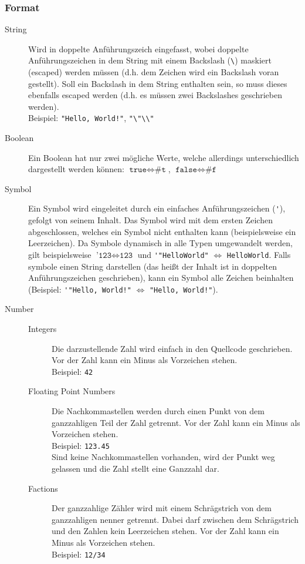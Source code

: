 \subsubsection{Format}
\begin{description}
	\item[String] Wird in doppelte Anführungszeich eingefasst, wobei doppelte Anführungszeichen in dem String mit einem Backslash (\texttt{\textbackslash}) maskiert (escaped) werden müssen (d.h. dem Zeichen wird ein Backslash voran gestellt). Soll ein Backslash in dem String enthalten sein, so muss dieses ebenfalls escaped werden (d.h. es müssen zwei Backslashes geschrieben werden). \\ Beispiel: \verb$"Hello, World!"$, \verb$"\"\\"$
	\item[Boolean] Ein Boolean hat nur zwei mögliche Werte, welche allerdings unterschiedlich dargestellt werden können: $ \texttt{true} \iff \texttt{\#t} $, $ \texttt{false} \iff \texttt{\#f} $
	\item[Symbol] Ein Symbol wird eingeleitet durch ein einfaches Anführungszeichen (\verb$'$), gefolgt von seinem Inhalt. Das Symbol wird mit dem ersten Zeichen abgeschlossen, welches ein Symbol nicht enthalten kann (beispielsweise ein Leerzeichen). Da Symbole dynamisch in alle Typen umgewandelt werden, gilt beispielsweise $ \texttt{'123} \iff \texttt{123} $
		und \verb$'"HelloWorld"$ $ \iff $ \verb$HelloWorld$. Falls symbole einen String darstellen (das heißt der Inhalt ist in doppelten Anführungszeichen geschrieben), kann ein Symbol alle Zeichen beinhalten (Beispiel: \verb$'"Hello, World!"$ $ \iff $ \verb$"Hello, World!"$).
	\item[Number]
		\begin{description}
			\item[Integers] Die darzustellende Zahl wird einfach in den Quellcode geschrieben. Vor der Zahl kann ein Minus als Vorzeichen stehen. \\ Beispiel: \texttt{42}
			\item[Floating Point Numbers] Die Nachkommastellen werden durch einen Punkt von dem ganzzahligen Teil der Zahl getrennt. Vor der Zahl kann ein Minus als Vorzeichen stehen. \\ Beispiel: \texttt{123.45} \\ Sind keine Nachkommastellen vorhanden, wird der Punkt weg gelassen und die Zahl stellt eine Ganzzahl dar.
			\item[Factions] Der ganzzahlige Zähler wird mit einem Schrägstrich von dem ganzzahligen nenner getrennt. Dabei darf zwischen dem Schrägstrich und den Zahlen kein Leerzeichen stehen. Vor der Zahl kann ein Minus als Vorzeichen stehen. \\ Beispiel: \texttt{12/34}

\end{description}
\end{description}
